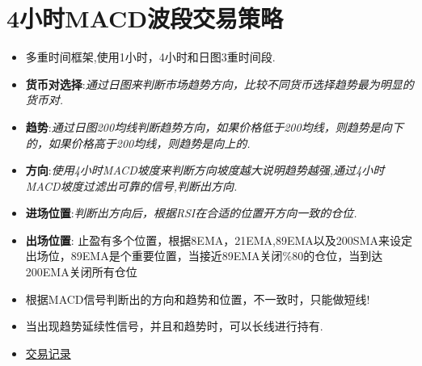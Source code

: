
%

\section*{4小时MACD波段交易策略}
\begin{itemize}
\item 多重时间框架,使用1小时，4小时和日图3重时间段.
\item \textbf{货币对选择}:\textit{通过日图来判断市场趋势方向，比较不同货币选择趋势最为明显的货币对.}
\item \textbf{趋势}:\textit{通过日图200均线判断趋势方向，如果价格低于200均线，则趋势是向下的，如果价格高于200均线，则趋势是向上的.}
\item \textbf{方向}:\textit{使用4小时MACD坡度来判断方向坡度越大说明趋势越强,通过4小时MACD坡度过滤出可靠的信号,判断出方向.}
\item \textbf{进场位置}:\textit{判断出方向后，根据RSI在合适的位置开方向一致的仓位.}
\item \textbf{出场位置}: 止盈有多个位置，根据8EMA，21EMA,89EMA以及200SMA来设定出场位，89EMA是个重要位置，当接近89EMA关闭\%80的仓位，当到达200EMA关闭所有仓位
\item 根据MACD信号判断出的方向和趋势和位置，不一致时，只能做短线!
\item 当出现趋势延续性信号，并且和趋势时，可以长线进行持有.
\item \href{run:4Hour MACD deals.xlsm}{交易记录} 
\end{itemize}







